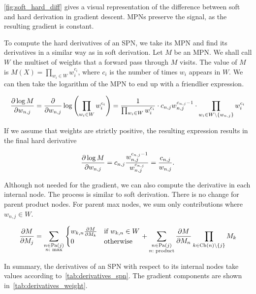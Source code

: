\autoref{fig:soft_hard_diff} gives a visual representation of the difference between soft and hard
derivation in gradient descent. MPNs preserve the signal, as the resulting gradient is constant.

To compute the hard derivatives of an SPN, we take its MPN and find its derivatives in a similar
way as in soft derivation. Let $M$ be an MPN\@. We shall call $W$ the multiset of weights that a
forward pass through $M$ visits. The value of $M$ is $M(X)=\prod_{w_i\in W}w_i^{c_i}$, where $c_i$
is the number of times $w_i$ appears in $W$. We can then take the logarithm of the MPN to end up
with a friendlier expression.

\begin{equation*}
  \frac{\partial\log M}{\partial w_{n,j}}=\frac{\partial}{\partial w_{n,j}}\log\left(\prod_{w_i\in W}w_i^{c_i}\right)=
    \frac{1}{\prod_{w_i\in W}w_i^{c_i}}\cdot c_{n,j}w_{n,j}^{c_{n,j}-1}\cdot\prod_{w_i\in
      W\setminus\{w_{n,j}\}}w_i^{c_i}
\end{equation*}

If we assume that weights are strictly positive, the resulting expression results in the final
hard derivative

\begin{equation}
  \frac{\partial\log M}{\partial w_{n,j}}=c_{n,j}\frac{w_{n,j}^{c_{n,j}-1}}{w_{n,j}^{c_{n,j}}}=
    \frac{c_{n,j}}{w_{n,j}}.\label{eq:hard_weight_update}
\end{equation}

Although not needed for the gradient, we can also compute the derivative in each internal node. The
process is similar to soft derivation. There is no change for parent product nodes. For parent max
nodes, we sum only contributions where $w_{n,j}\in W$.

\begin{equation}
  \frac{\partial M}{\partial M_j}=\sum_{\substack{n\in\operatorname*{\text{Pa}}(j)\\n:\text{ max}}}
    \begin{cases}
      w_{k,n}\frac{\partial M}{\partial M_k} & \text{if $w_{k,n}\in W$}\\
      0 & \text{otherwise}
    \end{cases}
    + \sum_{\substack{n\in\operatorname*{\text{Pa}}(j)\\n:\text{ product}}}\frac{\partial M}{\partial M_n}\prod_{k\in\operatorname*{\text{Ch}}(n)\setminus\{j\}}M_k
\end{equation}

In summary, the derivatives of an SPN with respect to its internal nodes take values according
to~\autoref{tab:derivatives_spn}. The gradient components are shown
in~\autoref{tab:derivatives_weight}.


